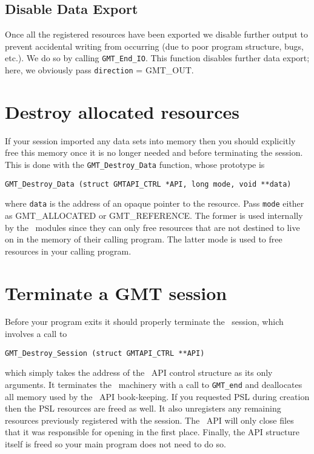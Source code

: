\documentclass{report}
\begin{document}
\subsection{Disable Data Export}

Once all the registered resources have been exported we disable further output to prevent accidental
writing from occurring (due to poor program structure, bugs, etc.).  We do so by calling \texttt{GMT\_End\_IO}.  This
function disables further data export; here, we obviously pass \texttt{direction} = GMT\_OUT.

\section{Destroy allocated resources}

If your session imported any data sets into memory then you should explicitly free this
memory once it is no longer needed and before terminating the session.
This is done with the \texttt{GMT\_Destroy\_Data} function, whose prototype is

\begin{verbatim}
GMT_Destroy_Data (struct GMTAPI_CTRL *API, long mode, void **data)
\end{verbatim}
where \texttt{data} is the address of an opaque pointer to the resource.
Pass \texttt{mode} either as GMT\_ALLOCATED or GMT\_REFERENCE.  The former
is used internally by the \GMT\ modules since they can only free resources that are
not destined to live on in the memory of their calling program.  The latter mode is used
to free resources in your calling program.

\section{Terminate a GMT session}

Before your program exits it should properly terminate the \GMT\ session, which involves a call to

\begin{verbatim}
GMT_Destroy_Session (struct GMTAPI_CTRL **API)
\end{verbatim}
which simply takes the address of the \GMT\ API control structure as its only arguments.  It terminates the \GMT\ machinery
with a call to \texttt{GMT\_end} and deallocates all memory used by the \GMT\ API book-keeping. If you
requested PSL during creation then the PSL resources are freed as well.  It
also unregisters any remaining resources previously registered with the session.
The \GMT\ API will only close files that it was responsible for opening in the first place.
Finally, the API structure itself is freed so your main program does not need to do so.
\end{document}
